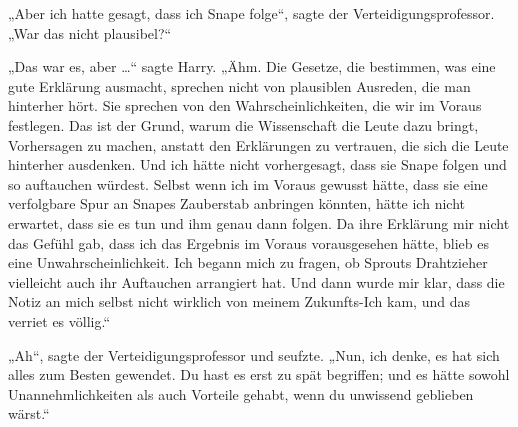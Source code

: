 „Aber ich hatte gesagt, dass ich Snape folge“, sagte der Verteidigungsprofessor.
„War das nicht plausibel?“

„Das war es, aber …“ sagte Harry. „Ähm. Die Gesetze, die bestimmen, was eine gute Erklärung ausmacht, sprechen nicht von plausiblen Ausreden, die man hinterher hört. Sie sprechen von den Wahrscheinlichkeiten, die wir im Voraus festlegen. Das ist der Grund, warum die Wissenschaft die Leute dazu bringt, Vorhersagen zu machen, anstatt den Erklärungen zu vertrauen, die sich die Leute hinterher ausdenken. Und ich hätte nicht vorhergesagt, dass sie Snape folgen und so auftauchen würdest. Selbst wenn ich im Voraus gewusst hätte, dass sie eine verfolgbare Spur an Snapes Zauberstab anbringen könnten, hätte ich nicht erwartet, dass sie es tun und ihm genau dann folgen. Da ihre Erklärung mir nicht das Gefühl gab, dass ich das Ergebnis im Voraus vorausgesehen hätte, blieb es eine Unwahrscheinlichkeit. Ich begann mich zu fragen, ob Sprouts Drahtzieher vielleicht auch ihr Auftauchen arrangiert hat. Und dann wurde mir klar, dass die Notiz an mich selbst nicht wirklich von meinem Zukunfts-Ich kam, und das verriet es völlig.“

„Ah“, sagte der Verteidigungsprofessor und seufzte.
„Nun, ich denke, es hat sich alles zum Besten gewendet. Du hast es erst zu spät begriffen; und es hätte sowohl Unannehmlichkeiten als auch Vorteile gehabt, wenn du unwissend geblieben wärst.“

